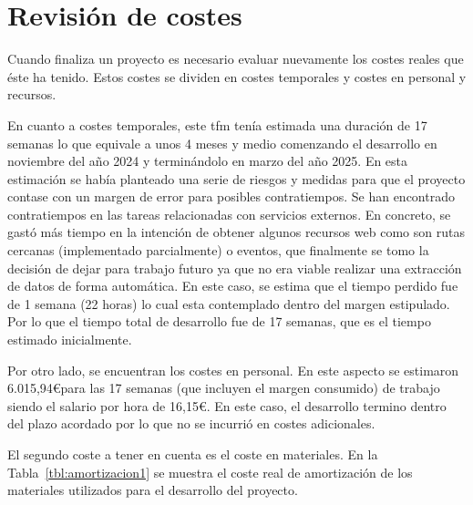 
\section{Revisión de costes}
Cuando finaliza un proyecto es necesario evaluar nuevamente los costes reales que éste ha tenido. Estos costes se dividen en costes temporales y costes en personal y recursos.

En cuanto a costes temporales, este \gls{tfm} tenía estimada una duración de 17 semanas lo que equivale a unos 4 meses y medio comenzando el desarrollo en noviembre del año 2024 y terminándolo en marzo del año 2025. En esta estimación se había planteado una serie de riesgos y medidas para que el proyecto contase con un margen de error para posibles contratiempos. Se han encontrado contratiempos en las tareas relacionadas con servicios externos. En concreto, se gastó más tiempo en la intención de obtener algunos recursos web como son rutas cercanas (implementado parcialmente) o eventos, que finalmente se tomo la decisión de dejar para trabajo futuro ya que no era viable realizar una extracción de datos de forma automática. En este caso, se estima que el tiempo perdido fue de 1 semana (22 horas) lo cual esta contemplado dentro del margen estipulado. Por lo que el tiempo total de desarrollo fue de 17 semanas, que es el tiempo estimado inicialmente.

Por otro lado, se encuentran los costes en personal. En este aspecto se estimaron 6.015,94\euro\space para las 17 semanas (que incluyen el margen consumido) de trabajo siendo el salario por hora de 16,15\euro\space. En este caso, el desarrollo termino dentro del plazo acordado por lo que no se incurrió en costes adicionales. 

El segundo coste a tener en cuenta es el coste en materiales. En la Tabla~\ref{tbl:amortizacion1} se muestra el coste real de amortización de los materiales utilizados para el desarrollo del proyecto.


